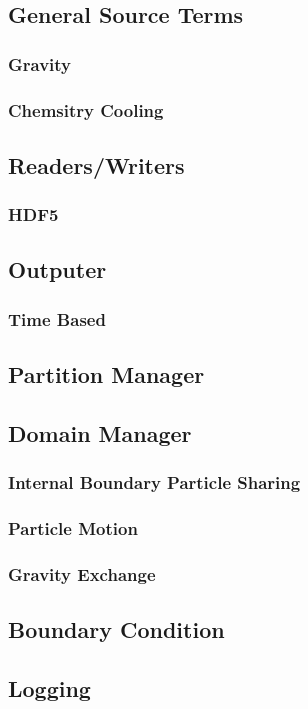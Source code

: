 \subsection{General Source Terms}
\subsubsection{Gravity}
\subsubsection{Chemsitry Cooling}

\subsection{Readers/Writers}
\subsubsection{HDF5}

\subsection{Outputer}
\subsubsection{Time Based}

\subsection{Partition Manager}

\subsection{Domain Manager}
\subsubsection{Internal Boundary Particle Sharing}
\subsubsection{Particle Motion}
\subsubsection{Gravity Exchange}

\subsection{Boundary Condition}

\subsection{Logging}
